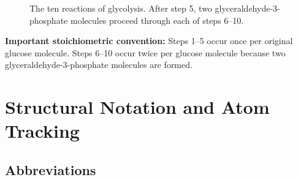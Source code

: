 \documentclass[11pt,a4paper]{article}
\newcommand{\ADP}{\ce{ADP}}
\newcommand{\NAD}{\ce{NAD+}}
\newcommand{\Note}[1]{\par\smallskip
  \noindent\colorbox{gray!12}{
    \parbox{0.96\linewidth}{#1}
  }\par\smallskip}
\begin{document}
\begin{figure}[htbp]
{
}
\caption{The ten reactions of glycolysis. After step 5, two glyceraldehyde-3-phosphate
molecules proceed through each of steps 6--10.}
\label{fig:overview}
\end{figure}

\Note{
\textbf{Important stoichiometric convention:}
Steps 1--5 occur once per original glucose molecule.
Steps 6--10 occur twice per glucose molecule because two
glyceraldehyde-3-phosphate molecules are formed.
}

\section{Structural Notation and Atom Tracking}
\label{sec:notation}

\subsection{Abbreviations}
\end{document}
